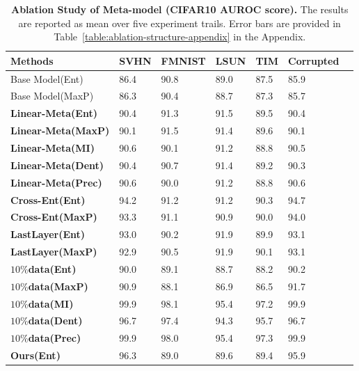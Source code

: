 \begin{table}[h]
  \begin{center}
  \scriptsize
  \captionsetup{font=small}
  \caption{\textbf{Ablation Study of Meta-model (CIFAR10 AUROC score).} The results are reported as mean over five experiment trails. Error bars are provided in Table~\ref{table:ablation-structure-appendix} in the Appendix.}
  \vspace{-1.5em}
  \begin{tabular}{lllllll}
    \\
    \toprule
    \textbf{Methods} & \textbf{SVHN}& \textbf{FMNIST} & \textbf{LSUN}& \textbf{TIM} &\textbf{Corrupted} \\
    \hline
     Base Model(Ent)  & 86.4 & 90.8 & 89.0 & 87.5 & 85.9  \\
    Base Model(MaxP)  & 86.3 & 90.4 & 88.7 & 87.3 & 85.7   \\
    \hline
            \textbf{Linear-Meta(Ent)}  & 90.4 & 91.3 & 91.5 & 89.5 & 90.4 \\
            \textbf{Linear-Meta(MaxP)}  & 90.1 & 91.5 & 91.4 & 89.6 & 90.1 \\
            \textbf{Linear-Meta(MI)}  & 90.6 & 90.1 & 91.2 & 88.8 & 90.5 \\
            \textbf{Linear-Meta(Dent)}  & 90.4 & 90.7 & 91.4 & 89.2 & 90.3 \\
            \textbf{Linear-Meta(Prec)} & 90.6 & 90.0 & 91.2 & 88.8 & 90.6\\
    \hline
      \textbf{Cross-Ent(Ent)}  & 94.2 & 91.2 & 91.2 &  90.3& 94.7 \\
        \textbf{Cross-Ent(MaxP)}  & 93.3& 91.1 &90.9 &  90.0 & 94.0 \\
    \hline
       \textbf{LastLayer(Ent)}& 93.0& 90.2 & 91.9 &  89.9& 93.1 \\
        \textbf{LastLayer(MaxP)} & 92.9 & 90.5 &91.9&  90.1 & 93.1\\
    \hline        
    \textbf{$10\%$data(Ent)}  & 90.0 &89.1& 88.7 &  88.2& 90.2 \\
              \textbf{$10\%$data(MaxP)} & 90.9 & 88.1&86.9&  86.5& 91.7 \\
              \textbf{$10\%$data(MI)}& 99.9 & 98.1 & 95.4&  97.2 & 99.9 \\
              \textbf{$10\%$data(Dent)}  & 96.7 & 97.4 & 94.3&  95.7 & 96.7\\
               \textbf{$10\%$data(Prec)}  & 99.9& 98.0& 95.4 &  97.3& 99.9 \\
    \hline        
    \textbf{Ours(Ent)}  & 96.3 &89.0& 89.6 &  89.4& 95.9 \\

\end{tabular}
\end{center}
\end{table}
